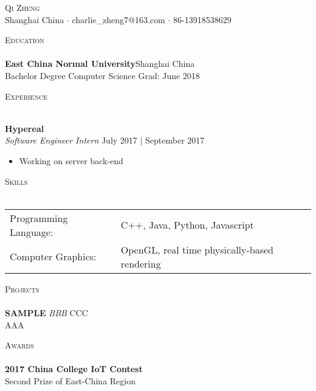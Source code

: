 \documentclass[a4paper]{article}
\newcommand{\lineunder} {
    \vspace*{-8pt} \\
    \hspace*{-18pt} \hrulefill \\
}
\newcommand{\header} [1] {
    {\hspace*{-18pt}\vspace*{6pt} \textsc{#1}}
    \vspace*{-6pt} \lineunder
}
\begin{document}
\vspace*{-40pt}

\vspace*{-10pt}
\begin{center}
	{\Huge \scshape {Qi Zheng}}\\
	Shanghai China $\cdot$ charlie\_zheng7@163.com $\cdot$ 86-13918538629\\
\end{center}

\vspace*{2mm}

\header{Education}
\textbf{East China Normal University}\hfill Shanghai China\\
Bachelor Degree Computer Science \hfill Grad: June 2018\\
\vspace{2mm}

\vspace*{2mm}

\header{Experience}
\vspace{1mm}

\textbf{Hypereal}\\
\textit{Software Engineer Intern} \hfill July 2017 | September 2017\\
\vspace{-1mm}
\begin{itemize} \itemsep 1pt
	\item Working on server back-end
\end{itemize}

\header{Skills}
\begin{tabular}{ l l }
	Programming Language: & C++, Java, Python, Javascript                \\
	Computer Graphics:    & OpenGL, real time physically-based rendering \\
\end{tabular}

\vspace*{2mm}

\header{Projects}
{\textbf{SAMPLE} \sl BBB} \hfill CCC\\
AAA\\
\vspace*{2mm}

\vspace*{2mm}

\header{Awards}
\textbf{2017 China College IoT Contest}\\
Second Prize of East-China Region\\
\vspace*{2mm}

\ 
\end{document}
